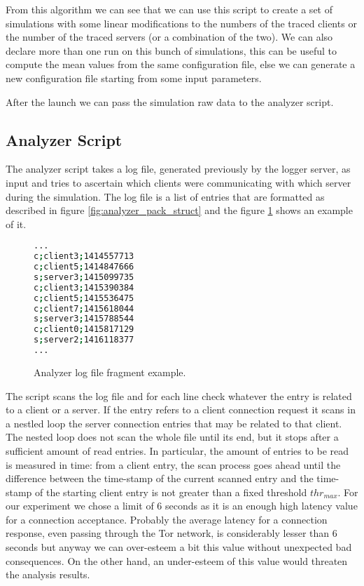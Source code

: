 From this algorithm we can see that we can use this script to create a set of
simulations with some linear modifications to the numbers of the traced clients
or the number of the traced servers (or a combination of the two).
We can also declare more than one run on this bunch of simulations, this can
be useful to compute the mean values from the same configuration file, else we
can generate a new configuration file starting from some input parameters.

After the launch we can pass the simulation raw data to the analyzer script.

\subsection{Analyzer Script}
The analyzer script takes a log file, generated previously by the logger
server, as input and tries to
ascertain which clients were communicating with which server during the
simulation. The log file is a list of entries that are formatted as described in
 figure \ref{fig:analyzer_pack_struct} and the figure
\ref{fig:example_log_file} shows an example of it.
\begin{figure}[H]
\centering
\begin{lstlisting}[language=bash,frame=single]
...
c;client3;1414557713
c;client5;1414847666
s;server3;1415099735
c;client3;1415390384
c;client5;1415536475
c;client7;1415618044
s;server3;1415788544
c;client0;1415817129
s;server2;1416118377
...
\end{lstlisting}
\caption{Analyzer log file fragment example.}
\label{fig:example_log_file}
\end{figure}
The script scans the log file and for each line check whatever the entry is
related to a client or a server. If the entry refers to a client
connection request it scans in a nestled loop the server connection entries
that may be related to that client. The nested loop does not scan the whole
file until its end, but it stops after a sufficient amount of
read entries. In particular, the amount of entries to be read is
measured in time: from a client entry, the scan process goes
ahead until the difference between the time-stamp of the current scanned 
entry and the time-stamp of the starting client entry is not greater
than a fixed threshold $thr_{max}$. For our experiment we chose a limit of 6
seconds as it is an enough high latency
value for a connection acceptance. Probably the average latency for a
connection response, even passing through the Tor network, is
considerably lesser than 6 seconds but anyway we can over-esteem a bit this
value without unexpected bad consequences. On the other hand, an under-esteem of
this value would threaten the analysis results. 


